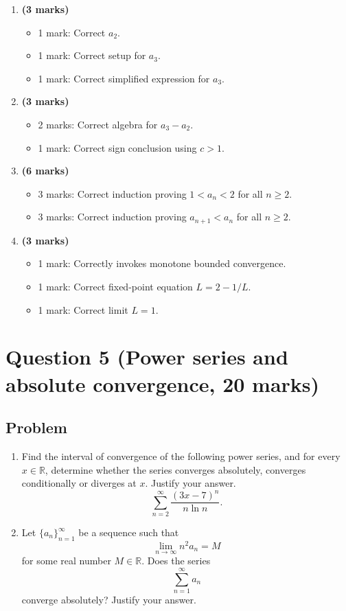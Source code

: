 \documentclass[12pt]{article}
\newcommand{\R}{\mathbb{R}}
\begin{document}
\begin{enumerate}[label=(\roman*)]
\item \textbf{(3 marks)}
\begin{itemize}
\item 1 mark: Correct $a_2$.
\item 1 mark: Correct setup for $a_3$.
\item 1 mark: Correct simplified expression for $a_3$.
\end{itemize}

\item \textbf{(3 marks)}
\begin{itemize}
\item 2 marks: Correct algebra for $a_3-a_2$.
\item 1 mark: Correct sign conclusion using $c>1$.
\end{itemize}

\item \textbf{(6 marks)}
\begin{itemize}
\item 3 marks: Correct induction proving $1<a_n<2$ for all $n\ge2$.
\item 3 marks: Correct induction proving $a_{n+1}<a_n$ for all $n\ge2$.
\end{itemize}

\item \textbf{(3 marks)}
\begin{itemize}
\item 1 mark: Correctly invokes monotone bounded convergence.
\item 1 mark: Correct fixed-point equation $L=2-1/L$.
\item 1 mark: Correct limit $L=1$.
\end{itemize}
\end{enumerate}

\newpage
\section{Question 5 (Power series and absolute convergence, 20 marks)}

\subsection{Problem}

\begin{enumerate}[label=(\alph*)]
\item Find the interval of convergence of the following power series, and for every $x\in\R$, determine whether the series converges absolutely, converges conditionally or diverges at $x$. Justify your answer.
\[
\sum_{n=2}^{\infty}\frac{(3x-7)^n}{n\ln n}.
\]

\item Let $\{a_n\}_{n=1}^{\infty}$ be a sequence such that
\[
\lim_{n\to\infty} n^2a_n=M
\]
for some real number $M\in\R$. Does the series
\[
\sum_{n=1}^{\infty}a_n
\]
converge absolutely? Justify your answer.
\end{enumerate}
\end{document}
